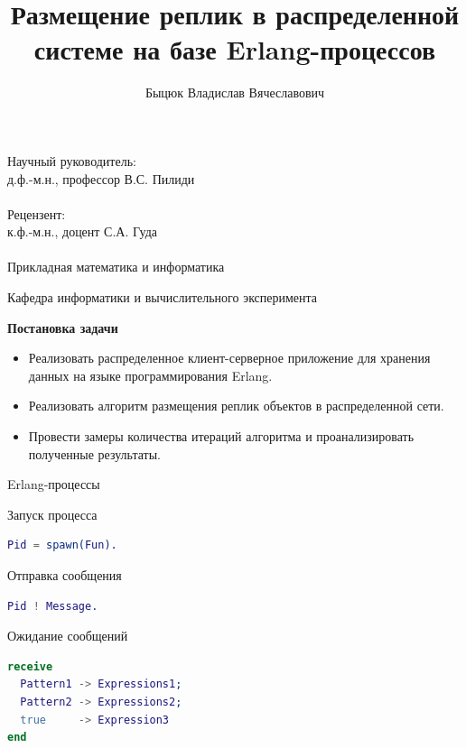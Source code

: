 \documentclass{beamer}
\title[]{Размещение реплик в распределенной\\системе на базе Erlang-процессов}
\author[Быцюк В.В.]{Быцюк Владислав Вячеславович}
\date[]{}
\begin{document}

\begin{frame}
	\titlepage
	\begin{center}
		Научный руководитель:\\д.ф.-м.н., профессор В.С. Пилиди\\~\\

		Рецензент:\\к.ф.-м.н., доцент С.А. Гуда\\~\\

		Прикладная математика и информатика

		Кафедра информатики и вычислительного эксперимента
	\end{center}
\end{frame}

\begin{frame}{\LARGE \textbf{Постановка задачи}}
	\begin{itemize}
		\item Реализовать распределенное клиент-серверное приложение для хранения данных на языке программирования Erlang. 
    	\item Реализовать алгоритм размещения реплик объектов в распределенной сети. 
    	\item Провести замеры количества итераций алгоритма и проанализировать полученные результаты.
	\end{itemize}
\end{frame}
	
	

\begin{frame}[fragile]{Erlang-процессы}
	\begin{block}{Запуск процесса}
		\begin{lstlisting}[language = erlang] 	
Pid = spawn(Fun).
		\end{lstlisting}
	\end{block}	

	\begin{block}{Отправка сообщения}
		\begin{lstlisting}[language = erlang] 	
Pid ! Message.
		\end{lstlisting}
	\end{block}	

	\begin{block}{Ожидание сообщений}
		\begin{lstlisting}[language = erlang] 	
receive
  Pattern1 -> Expressions1;
  Pattern2 -> Expressions2;
  true     -> Expression3
end
		\end{lstlisting}
	\end{block}	
\end{frame}
\end{document}
